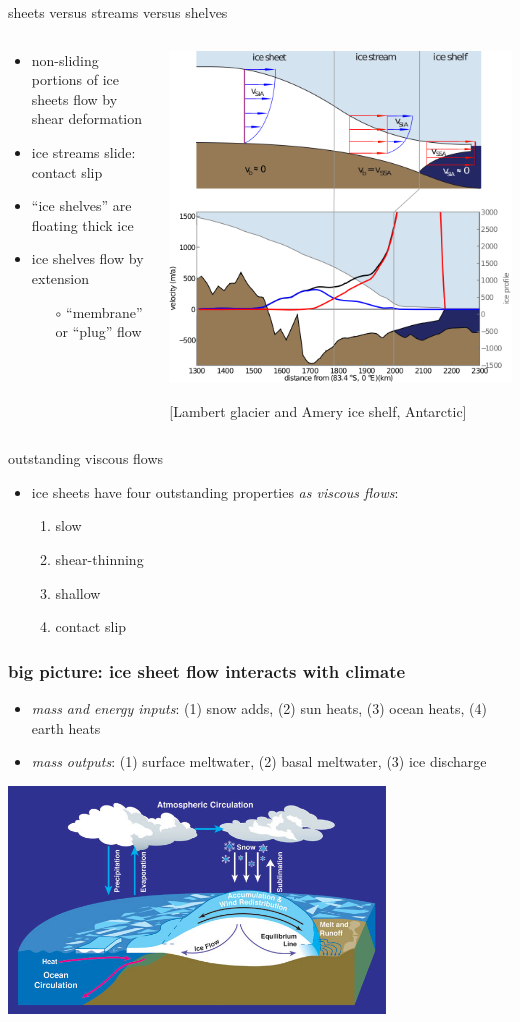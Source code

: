 \documentclass{beamer}
\newcommand{\contactslipslide}{
\begin{frame}{sheets versus streams versus shelves}

\begin{columns}
\begin{column}{0.35\textwidth}
\small
\begin{itemize}
\small
\item non-sliding portions of ice sheets flow by shear deformation
\item ice streams slide: \alert{contact slip}
\item ``ice shelves'' are floating thick ice
\item ice shelves flow by extension
  \begin{itemize}
  \scriptsize
  \item[$\circ$] ``membrane'' or ``plug'' flow
  \end{itemize}
\end{itemize}
\end{column}

\begin{column}{0.65\textwidth}
\includegraphics[width=1.1\textwidth]{siassacartoon-lambert}

\begin{center}
\vspace{-0.18in}
\tiny [Lambert glacier and Amery ice shelf, Antarctic]
\end{center}
\end{column}
\end{columns}
\end{frame}
}
\begin{document}

\contactslipslide


\begin{frame}{outstanding viscous flows}

\begin{itemize}
\item ice sheets have four outstanding properties \emph{as viscous flows}:
  \begin{enumerate}
  \item \alert{slow}
  \item \alert{shear-thinning}
  \item \alert{shallow}
  \item \alert{contact slip}
  \end{enumerate}
\end{itemize}
\end{frame}


\begin{frame}
  \frametitle{big picture: ice sheet flow interacts with climate}

\medskip
\small
\begin{itemize}
\item \emph{mass and energy inputs}: (1) snow adds, (2) sun heats, (3) ocean heats, (4) earth heats
\item \emph{mass outputs}: (1) surface meltwater, (2) basal meltwater, (3) ice discharge
\end{itemize}

\begin{center}
  \includegraphics[width=0.75\textwidth]{mass-bal-atmos}
\end{center}
\end{frame}
\end{document}
